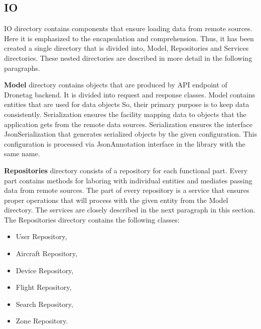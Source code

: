\subsection{IO}\label{subsec:io}
IO directory contains components that ensure loading data from remote sources.
Here it is emphasized to the encapsulation and comprehension.
Thus, it has been created a single directory that is divided into, Model, Repositories and Services directories.
These nested directories are described in more detail in the following paragraphs.

\textbf{Model} directory contains objects that are produced by API endpoint of Dronetag backend.
It is divided into request and response classes.
Model contains entities that are used for data objects
So, their primary purpose is to keep data consistently.
Serialization ensures the facility mapping data to objects that the application gets from the remote data sources.
Serialization ensures the interface JsonSerialization that generates serialized objects by the given configuration.
This configuration is processed via JsonAnnotation interface in the library with the same name.

\textbf{Repositories} directory consists of a repository for each functional part.
Every part contains methods for laboring with individual entities and mediates passing data from remote sources.
The part of every repository is a service that ensures proper operations that will process with the given entity from the Model directory.
The services are closely described in the next paragraph in this section.
The Repositories directory contains the following classes:
\begin{itemize}
    \item User Repository,
    \item Aircraft Repository,
    \item Device Repository,
    \item Flight Repository,
    \item Search Repository,
    \item Zone Repository.
\end{itemize}

